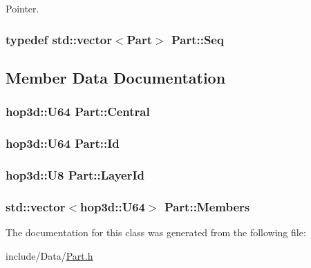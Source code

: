 Pointer. 

\hypertarget{class_part_a9cbb31df0bd4615cb133293acd55a938}{
\subsubsection[{Seq}]{\setlength{\rightskip}{0pt plus 5cm}typedef std\-::vector$<${\bf Part}$>$ {\bf Part\-::\-Seq}}}\label{class_part_a9cbb31df0bd4615cb133293acd55a938}


\subsection{Member Data Documentation}
\hypertarget{class_part_a1dafacbc907066c3976ca09dc69a7421}{
\subsubsection[{Central}]{\setlength{\rightskip}{0pt plus 5cm}hop3d\-::\-U64 Part\-::\-Central}}\label{class_part_a1dafacbc907066c3976ca09dc69a7421}
\hypertarget{class_part_a3d19e990ee30d25cd5f12610864300db}{
\subsubsection[{Id}]{\setlength{\rightskip}{0pt plus 5cm}hop3d\-::\-U64 Part\-::\-Id}}\label{class_part_a3d19e990ee30d25cd5f12610864300db}
\hypertarget{class_part_ac4e9f24ead3926518a74b37c5101efc0}{
\subsubsection[{Layer\-Id}]{\setlength{\rightskip}{0pt plus 5cm}hop3d\-::\-U8 Part\-::\-Layer\-Id}}\label{class_part_ac4e9f24ead3926518a74b37c5101efc0}
\hypertarget{class_part_ad5e3891ace1e60c4b0c9b86bad225a38}{
\subsubsection[{Members}]{\setlength{\rightskip}{0pt plus 5cm}std\-::vector$<$hop3d\-::\-U64$>$ Part\-::\-Members}}\label{class_part_ad5e3891ace1e60c4b0c9b86bad225a38}


The documentation for this class was generated from the following file\-:\begin{DoxyCompactItemize}
\item 
include/\-Data/\hyperlink{_part_8h}{Part.\-h}\end{DoxyCompactItemize}
